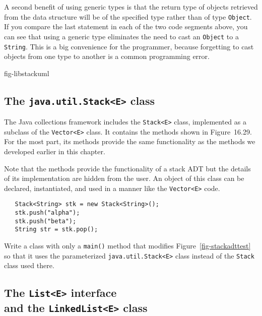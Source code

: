 A second benefit of using generic types is that the return type of
objects retrieved from the data structure will be of the specified
type rather than of type {\tt Object}.  If you compare the last
statement in each of the two code segments above, you can see that
using a generic type eliminates the need to cast an {\tt Object} to a
{\tt String}.  This is a big convenience for the programmer, because
forgetting to cast objects from one type to another is a common
programming error.

{fig-libstackuml}

\subsection*{The {\tt java.util.Stack<E>} class}

The Java collections framework includes the {\tt Stack<E>} class,
implemented as a subclass of the {\tt Vector<E>} class.  It contains
the methods shown in Figure~16.29.  For the most part, its methods
provide the same functionality as the methods we developed earlier in
this chapter.  


\noindent Note that the methods provide the functionality of a stack ADT but the
details of its implementation are hidden from the user.  An object of
this class can be declared, instantiated, and used in a manner 
like the {\tt Vector<E>} code.

\begin{jjjlisting}
\begin{lstlisting}
   Stack<String> stk = new Stack<String>();
   stk.push("alpha");
   stk.push("beta");
   String str = stk.pop();
\end{lstlisting}
\end{jjjlisting}

\begin{SSTUDY}

\item  Write a class with only a {\tt main()} method
that modifies Figure~\ref{fig-stackadttest} so that it uses the parameterized
{\tt java.util.Stack<E>} class instead of the {\tt Stack} class used there.
\end{SSTUDY}

\subsection{The {\tt List<E>} interface \\and the {\tt LinkedList<E>} class}

